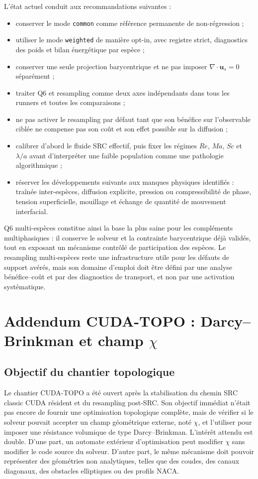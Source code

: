 \documentclass[11pt,a4paper]{article}
\begin{document}
L'état actuel conduit aux recommandations suivantes :
\begin{itemize}
  \item conserver le mode \texttt{common} comme référence permanente de non-régression ;
  \item utiliser le mode \texttt{weighted} de manière opt-in, avec registre strict, diagnostics des poids et bilan énergétique par espèce ;
  \item conserver une seule projection barycentrique et ne pas imposer $\nabla\cdot\bm{u}_s=0$ séparément ;
  \item traiter Q6 et resampling comme deux axes indépendants dans tous les runners et toutes les comparaisons ;
  \item ne pas activer le resampling par défaut tant que son bénéfice sur l'observable ciblée ne compense pas son coût et son effet possible sur la diffusion ;
  \item calibrer d'abord le fluide SRC effectif, puis fixer les régimes $Re$, $Ma$, $Sc$ et $\lambda/a$ avant d'interpréter une faible population comme une pathologie algorithmique ;
  \item réserver les développements suivants aux manques physiques identifiés : traînée inter-espèces, diffusion explicite, pression ou compressibilité de phase, tension superficielle, mouillage et échange de quantité de mouvement interfacial.
\end{itemize}

Q6 multi-espèces constitue ainsi la base la plus saine pour les compléments multiphasiques : il conserve le solveur et la contrainte barycentrique déjà validés, tout en exposant un mécanisme contrôlé de participation des espèces. Le resampling multi-espèces reste une infrastructure utile pour les défauts de support avérés, mais son domaine d'emploi doit être défini par une analyse bénéfice--coût et par des diagnostics de transport, et non par une activation systématique.


\section{Addendum CUDA-TOPO : Darcy--Brinkman et champ \texorpdfstring{$\chi$}{chi}}

\subsection{Objectif du chantier topologique}

Le chantier CUDA-TOPO a été ouvert après la stabilisation du chemin SRC classic CUDA résident et du resampling post-SRC. Son objectif immédiat n'était pas encore de fournir une optimisation topologique complète, mais de vérifier si le solveur pouvait accepter un champ géométrique externe, noté $\chi$, et l'utiliser pour imposer une résistance volumique de type Darcy--Brinkman. L'intérêt attendu est double. D'une part, un automate extérieur d'optimisation peut modifier $\chi$ sans modifier le code source du solveur. D'autre part, le même mécanisme doit pouvoir représenter des géométries non analytiques, telles que des coudes, des canaux diagonaux, des obstacles elliptiques ou des profils NACA.
\end{document}
